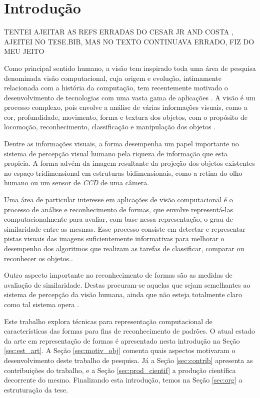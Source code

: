 
\chapter{Introdução \label{chap:INTRO}}


{\color{red} TENTEI AJEITAR AS REFS ERRADAS DO CESAR JR AND COSTA , AJEITEI NO TESE.BIB, MAS NO TEXTO CONTINUAVA ERRADO, FIZ DO MEU JEITO}

Como principal sentido humano, a visão tem inspirado toda uma área de pesquisa denominada visão computacional, cuja origem e evolução, intimamente relacionada com a história da computação, tem recentemente motivado o desenvolvimento de tecnologias com uma vasta gama de aplicações \cite{Costa:2009}. A visão é um processo complexo, pois envolve a análise de várias informações visuais, como a cor, profundidade, movimento, forma e textura dos objetos, com o propósito de locomoção, reconhecimento, classificação e manipulação dos objetos \cite{Ullman:1996}.

Dentre as informações visuais, a forma desempenha um papel importante no sistema de percepção visual humano pela riqueza de informação que esta propicia. A forma advém da imagem resultante da projeção dos objetos existentes no espaço tridimensional em estruturas bidimensionais, como a retina do olho humano ou um sensor de \emph{CCD} de uma câmera.

Uma área de particular interesse em aplicações de visão computacional é o processo de análise e reconhecimento de formas, que envolve representá-las computacionalmente para avaliar, com base nessa representação, o grau de similaridade entre as mesmas. Esse processo consiste em detectar e representar pistas visuais das imagens suficientemente informativas para melhorar o desempenho dos algoritmos que realizam as tarefas de classificar, comparar ou reconhecer os objetos.\cite{Escolano:2009}.

Outro aspecto importante no reconhecimento de formas são as medidas de avaliação de similaridade. Destas procuram-se aquelas que sejam semelhantes ao sistema de percepção da visão humana, ainda que não esteja totalmente claro como tal sistema opera \cite{4815272}. 

Este trabalho explora técnicas para representação computacional de características das formas para fins de reconhecimento de padrões. O atual estado da arte em representação de formas é apresentado nesta introdução na Seção \ref{sec:est_art}. A Seção \ref{sec:motiv_obj} comenta quais aspectos motivaram o desenvolvimento deste trabalho de pesquisa. Já a Seção \ref{sec:contrib} apresenta as contribuições do trabalho, e a Seção \ref{sec:prod_cientif} a produção científica decorrente do mesmo. Finalizando esta introdução, temos na Seção \ref{sec:org} a estruturação da tese.

